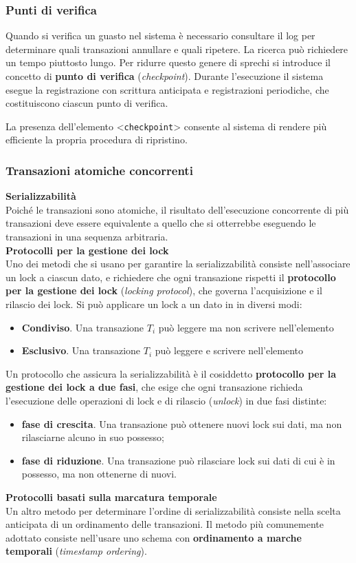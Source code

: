 \documentclass[11pt,a4paper]{article}
\begin{document}
\subsubsection{Punti di verifica}
Quando si verifica un guasto nel sistema è necessario consultare il log per determinare qua­li transazioni annullare e quali ripetere. La ricerca può richiedere un tempo piuttosto lungo.
Per ridurre questo genere di sprechi si introduce il concetto di \textbf{punto di verifica} (\emph{checkpoint}).
Durante l'esecuzione il sistema esegue la registrazione con scrittura anticipata e registrazioni
periodiche, che costituiscono ciascun punto di verifica.

La presenza dell'elemento <\texttt{checkpoint}> consente al sistema di rendere più efficiente la
propria procedura di ripristino.

\subsubsection{Transazioni atomiche concorrenti}
\textbf{Serializzabilità}\\
Poiché le
transazioni sono atomiche, il risultato dell'esecuzione concorrente di più transazioni deve
essere equivalente a quello che si otterrebbe eseguendo le transazioni in una sequenza arbi­traria.\medskip\\
\textbf{Protocolli per la gestione dei lock}\\
Uno dei metodi che si usano per garantire la serializzabilità consiste nell'associare un lock a
ciascun dato, e richiedere che ogni transazione rispetti il \textbf{protocollo per la gestione dei lock}
(\emph{locking protocol}), che governa l'acquisizione e il rilascio dei lock. Si può applicare un lock a
un dato in in diversi modi:
\begin{itemize}
  \item \textbf{Condiviso}. Una transazione $T_i$ può leggere ma non scrivere nell'elemento
  \item \textbf{Esclusivo}. Una transazione $T_i$ può leggere e scrivere nell'elemento
\end{itemize}
Un protocollo che assicura la serializzabilità è il cosiddetto \textbf{protocollo per la gestione
dei lock a due fasi}, che esige che ogni transazione richieda l'esecuzione delle operazioni di
lock e di rilascio (\emph{unlock}) in due fasi distinte:
\begin{itemize}
  \item \textbf{fase di crescita}. Una transazione può ottenere nuovi lock sui dati, ma non rilasciarne alcuno in suo possesso;
  \item \textbf{fase di riduzione}. Una transazione può rilasciare lock sui dati di cui è in possesso, ma non ottenerne di nuovi.
\end{itemize}\medskip
\textbf{Protocolli basati sulla marcatura temporale}\\
Un altro metodo per determinare l'or­dine di serializzabilità consiste nella scelta anticipata di un ordinamento delle transazioni. Il
metodo più comunemente adottato consiste nell'usare uno schema con \textbf{ordinamento a
marche temporali} (\emph{timestamp ordering}).
\end{document}
